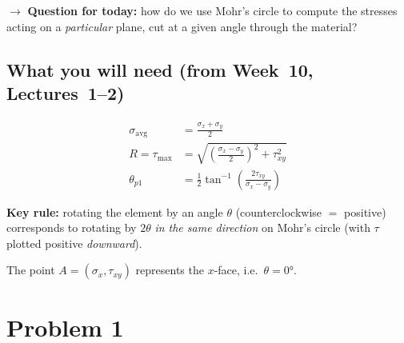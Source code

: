 \documentclass[11pt]{article}
\begin{document}

\begin{center}
\end{center}

\noindent
$\rightarrow$ \textbf{Question for today:} how do we use Mohr's circle to compute the
stresses acting on a \emph{particular} plane, cut at a given angle through the material?

\subsection*{What you will need (from Week~10, Lectures~1--2)}

\noindent
\begin{minipage}[t]{0.5\textwidth}
\begin{align*}
  \sigma_{\text{avg}} &= \frac{\sigma_x + \sigma_y}{2} \\
  R = \tau_{\max} &= \sqrt{\left(\frac{\sigma_x - \sigma_y}{2}\right)^2 + \tau_{xy}^2} \\
  \theta_{p1} &= \frac12 \tan^{-1}\!\left(\frac{2\tau_{xy}}{\sigma_x - \sigma_y}\right)
\end{align*}
\end{minipage}%
\hfill
\begin{minipage}[t]{0.46\textwidth}
\textbf{Key rule:} rotating the element by an angle $\theta$
(counterclockwise $= $ positive) corresponds to rotating by $2\theta$ \emph{in the same
direction} on Mohr's circle (with $\tau$ plotted positive \emph{downward}).

\medskip
The point $A = (\sigma_x, \tau_{xy})$ represents the $x$-face, i.e.\ $\theta = \ang{0}$.
\end{minipage}

\section*{Problem 1}
\end{document}
